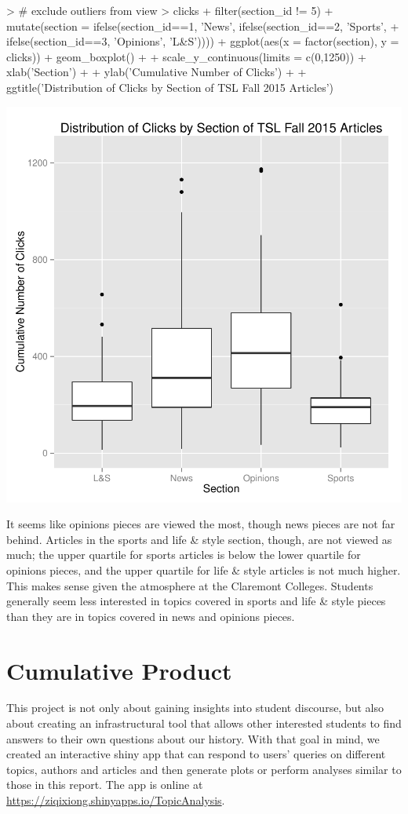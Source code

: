 \documentclass[a4paper]{article}
\begin{document}
\begin{Schunk}
\begin{Sinput}
> # exclude outliers from view
> clicks %
+   filter(section_id != 5) %
+   mutate(section = ifelse(section_id==1, 'News', ifelse(section_id==2, 'Sports',
+   ifelse(section_id==3, 'Opinions', 'L&S')))) %
+   ggplot(aes(x = factor(section), y = clicks)) + geom_boxplot() +
+   scale_y_continuous(limits = c(0,1250)) + xlab('Section') +
+   ylab('Cumulative Number of Clicks') +
+   ggtitle('Distribution of Clicks by Section of TSL Fall 2015 Articles')
\end{Sinput}
\end{Schunk}
\includegraphics{FinalProject-025}

It seems like opinions pieces are viewed the most, though news pieces are not far behind. Articles in the sports and life \& style section, though, are not viewed as much; the upper quartile for sports articles is below the lower quartile for opinions pieces, and the upper quartile for life \& style articles is not much higher. This makes sense given the atmosphere at the Claremont Colleges. Students generally seem less interested in topics covered in sports and life \& style pieces than they are in topics covered in news and opinions pieces.

\section{Cumulative Product}
This project is not only about gaining insights into student discourse, but also about creating an infrastructural tool that allows other interested students to find answers to their own questions about our history. With that goal in mind, we created an interactive shiny app that can respond to users' queries on different topics, authors and articles and then generate plots or perform analyses similar to those in this report. The app is online at \href{https://ziqixiong.shinyapps.io/TopicAnalysis}{https://ziqixiong.shinyapps.io/TopicAnalysis}.
\vspace{1cm}
\end{document}
